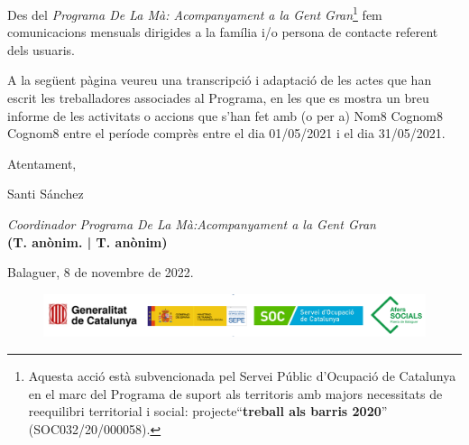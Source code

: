 \documentclass[a4paper,12pt]{elsarticle}  %
\begin{document}
Des del \textit{Programa De La Mà: Acompanyament a la Gent Gran}\footnote{Aquesta acció està subvencionada pel Servei Públic 
d'Ocupació de Catalunya en el marc del Programa de suport als territoris amb majors 
necessitats de reequilibri territorial i social: projecte``\textbf{treball als barris 2020}'' (SOC032/20/000058).} fem comunicacions mensuals
dirigides a la família i/o persona de contacte referent dels usuaris.


A la següent pàgina veureu una transcripció i adaptació de les actes que han escrit les treballadores associades
al Programa, en les que es mostra un breu informe de les activitats o accions que s'han fet amb (o per a) 
Nom8 Cognom8 Cognom8 entre el període comprès entre el dia 01/05/2021 i el dia 31/05/2021.

	\vspace{0.5cm}

\noindent Atentament,

\noindent Santi Sánchez

\noindent \textit{Coordinador Programa De La Mà:Acompanyament a la Gent Gran}\\
\textbf{(T. anònim. | T. anònim)}

	\vspace{0.5cm}

\noindent Balaguer, 8 de novembre de 2022.

	









\vfill

\FloatBarrier
\begin{figure}[h]
	\centering	
	\includegraphics[width=1\textwidth]{../IMATGES/logosGeneMinisterAferssocialsSoc.png}	
\end{figure}
\FloatBarrier	










\clearpage
\end{document}
